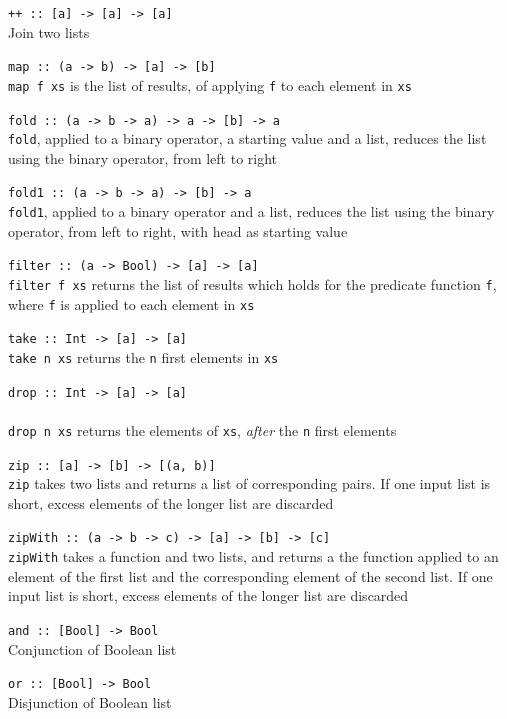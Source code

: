 \texttt{{++} :: [a] -> [a] -> [a]}\ \\
Join two lists

\texttt{map :: (a -> b) -> [a] -> [b]}\ \\
\texttt{map f xs} is the list of results, of applying \texttt{f} to each element in \texttt{xs}

\texttt{fold :: (a -> b -> a) -> a -> [b] -> a}\ \\
\texttt{fold}, applied to a binary operator, a starting value and a list,
   reduces the list using the binary operator, from left to right

\texttt{fold1 :: (a -> b -> a) -> [b] -> a}\ \\
\texttt{fold1}, applied to a binary operator and a list, reduces the list
   using the binary operator, from left to right, with head as
   starting value

\texttt{filter :: (a -> Bool) -> [a] -> [a]}\ \\
\texttt{filter f xs} returns the list of results which holds for the
   predicate function \texttt{f}, where \texttt{f} is applied to each element in \texttt{xs}

\texttt{take :: Int -> [a] -> [a]}\ \\
\texttt{take n xs} returns the \texttt{n} first elements in \texttt{xs}

\texttt{drop :: Int -> [a] -> [a]}\ \\\ \\
\texttt{drop n xs} returns the elements of \texttt{xs}, \emph{after} the \texttt{n} first elements

\texttt{zip :: [a] -> [b] -> [(a, b)]}\ \\
\texttt{zip} takes two lists and returns a list of corresponding pairs. If
   one input list is short, excess elements of the longer list are
   discarded

\texttt{zipWith :: (a -> b -> c) -> [a] -> [b] -> [c]}\ \\
\texttt{zipWith} takes a function and two lists, and returns a the
   function applied to an element of the first list and the
   corresponding element of the second list. If one input list is
   short, excess elements of the longer list are discarded

\texttt{and :: [Bool] -> Bool}\ \\
Conjunction of Boolean list

\texttt{or :: [Bool] -> Bool}\ \\
Disjunction of Boolean list

